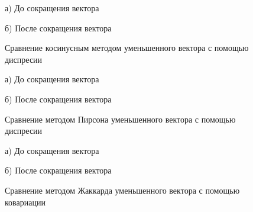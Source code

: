 \begin{figure}[H]
    \begin{minipage}[H]{0.5\linewidth}
        а) До сокращения вектора 
    \end{minipage}
    \begin{minipage}[H]{0.5\linewidth}
        б) После сокращения вектора 
    \end{minipage}
    \caption{Сравнение косинусным методом уменьшенного вектора с помощью диспресии}
    \label{fig:heatmapVarCos}
\end{figure}

\begin{figure}[H]
    \begin{minipage}[H]{0.5\linewidth}
        а) До сокращения вектора 
    \end{minipage}
    \begin{minipage}[H]{0.5\linewidth}
        б) После сокращения вектора 
    \end{minipage}
    \caption{Сравнение методом Пирсона уменьшенного вектора с помощью диспресии}
    \label{fig:heatmapVarPear}
\end{figure}

\begin{figure}[H]
    \begin{minipage}[H]{0.5\linewidth}
        а) До сокращения вектора 
    \end{minipage}
    \begin{minipage}[H]{0.5\linewidth}
        б) После сокращения вектора 
    \end{minipage}
    \caption{Сравнение методом Жаккарда уменьшенного вектора с помощью ковариации}
    \label{fig:heatmapCovJac}
\end{figure}

